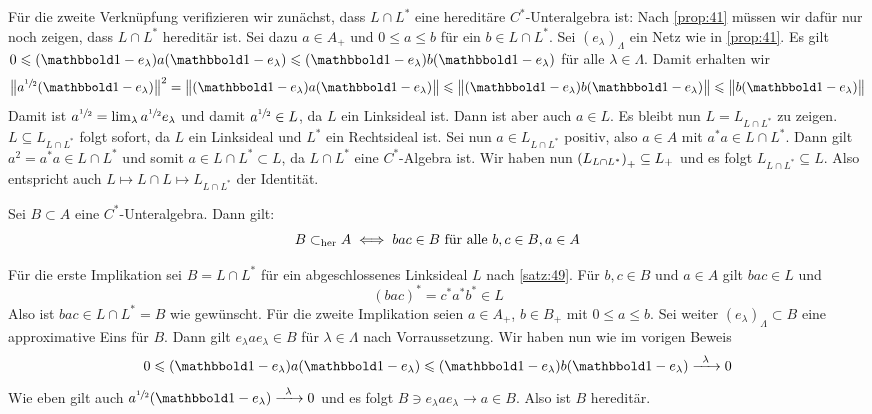 \begin{beweis}
	Für die zweite Verknüpfung verifizieren wir zunächst, dass $L \cap L^*$ eine hereditäre $C^*$-Unteralgebra ist: 
	Nach \autoref{prop:41} müssen wir dafür nur noch zeigen, dass $L \cap L^*$ hereditär ist.
	Sei dazu $a \in A_+$ und $0 \le a \le b$ für ein $b \in L \cap L^*$. 
	Sei $(e_\lambda)_\Lambda$ ein Netz wie in \autoref{prop:41}. Es gilt
	\(
		0 \le (\ind-e_\lambda)a(\ind - e_\lambda) \le (\ind -e_\lambda) b (\ind -e_\lambda)
	\)
	für alle $\lambda \in \Lambda$. Damit erhalten wir
	\[
		\norm[\big]{a^{\sfrac{1}{2}}(\ind -e_\lambda)}^2= \norm[\big]{(\ind-e_\lambda)a(\ind -e_\lambda)} \le \norm[\big]{(\ind-e_\lambda)b(\ind -e_\lambda)} \le \norm[\big]{b(\ind -e_\lambda)}
	\]
	Damit ist $a^{\sfrac{1}{2}}=\lim_\lambda a^{\sfrac{1}{2}} e_\lambda$ und damit $a^{\sfrac{1}{2}} \in L$, da $L$ ein Linksideal ist. 
	Dann ist aber auch $a \in L$. Es bleibt nun $L= L_{L \cap L^*}$ zu zeigen.
	$L \subseteq L_{L \cap L^*}$ folgt sofort, da $L$ ein Linksideal und $L^*$ ein Rechtsideal ist.
	Sei nun $a \in L_{L \cap L^*}$ positiv, also $a \in A$ mit $a^*a \in L \cap L^*$.
	Dann gilt $a^2=a^*a \in L \cap L^*$ und somit $a \in L \cap L^* \subset L$, da $L \cap L^*$ eine $C^*$-Algebra ist.
	Wir haben nun $\enbrace*{L_{L \cap L^*}}_+ \subseteq L_+$ und es folgt $L_{L \cap L^*} \subseteq L$.
	Also entspricht auch $L \mapsto L \cap L \mapsto L_{L \cap L^*}$ der Identität.
\end{beweis}

\begin{satz}[{name=[Charakterisierung hereditär]},label=satz:410]
	Sei $B \subset A$ eine $C^*$-Unteralgebra. Dann gilt: 
	\[
		B \subher A \iff bac \in B \text{ für alle } b,c \in B, a \in A 
	\]
\end{satz}
\begin{beweis}
	Für die erste Implikation sei $B = L \cap L^*$ für ein abgeschlossenes Linksideal $L$ nach \autoref{satz:49}. 
	Für $b,c \in B$ und $a \in A$ gilt $bac \in L$ und
	\[
		(bac)^* = c^*a^*b^* \in L
	\]
	Also ist $bac \in L \cap L^*=B$ wie gewünscht. 
	Für die zweite Implikation seien $a \in A_+$, $b \in B_+$ mit $0 \le a \le b$.
	Sei weiter $(e_\lambda)_\Lambda \subset B$ eine approximative Eins für $B$.
	Dann gilt $e_\lambda a e_\lambda \in B$ für $\lambda \in \Lambda$ nach Vorraussetzung.
	Wir haben nun wie im vorigen Beweis
	\[
		0 \le (\ind-e_\lambda)a(\ind - e_\lambda) \le (\ind -e_\lambda) b (\ind -e_\lambda) \grenzw{\lambda} 0
	\]
	Wie eben gilt auch $a^{\sfrac{1}{2}}(\ind -e_\lambda) \grenzw{\lambda} 0$ und  es folgt $B \ni e_\lambda a e_\lambda \to a \in B$.
	Also ist $B$ hereditär.
\end{beweis}

